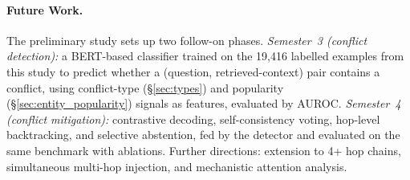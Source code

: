 \paragraph{Future Work.} The preliminary study sets up two follow-on phases. \emph{Semester~3 (conflict detection):} a BERT-based classifier trained on the 19{,}416 labelled examples from this study to predict whether a (question, retrieved-context) pair contains a conflict, using conflict-type (\S\ref{sec:types}) and popularity (\S\ref{sec:entity_popularity}) signals as features, evaluated by AUROC. \emph{Semester~4 (conflict mitigation):} contrastive decoding, self-consistency voting, hop-level backtracking, and selective abstention, fed by the detector and evaluated on the same benchmark with ablations. Further directions: extension to 4+ hop chains, simultaneous multi-hop injection, and mechanistic attention analysis.
